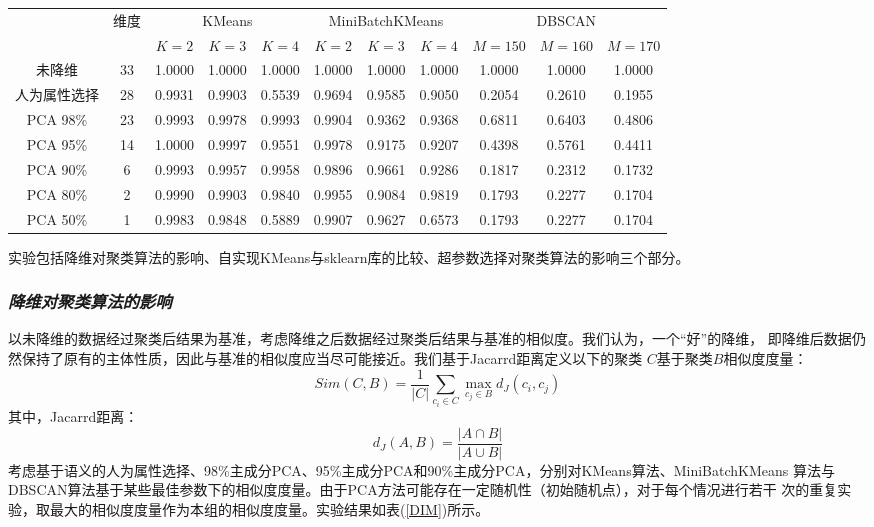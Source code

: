 \documentclass{acm_proc_article-sp}
\begin{document}
\begin{table*}[!ht]
       \small
       \centering
       \caption{降维对聚类算法影响评估}
       \begin{tabular}{@{}c|c|ccc|ccc|ccc@{}}
       \toprule
                     &\multicolumn{1}{c|}{\multirow{2}{*}{维度}} & \multicolumn{3}{c|}{KMeans} & \multicolumn{3}{c|}{MiniBatchKMeans} & \multicolumn{3}{c}{DBSCAN} \\
                     &\multicolumn{1}{c|}{}                     & $K=2$   & $K=3$   & $K=4$   & $K=2$      & $K=3$      & $K=4$      & $M=150$ & $M=160$ & $M=170$ \\ \midrule
       未降维         & 33                                       & 1.0000  & 1.0000  & 1.0000  & 1.0000     & 1.0000     & 1.0000     & 1.0000  & 1.0000  & 1.0000  \\
       人为属性选择    & 28                                       & 0.9931  & 0.9903  & 0.5539  & 0.9694     & 0.9585     & 0.9050     & 0.2054  & 0.2610  & 0.1955  \\
       PCA 98\%      & 23                                       & 0.9993  & 0.9978  & 0.9993  & 0.9904     & 0.9362     & 0.9368     & 0.6811  & 0.6403  & 0.4806  \\
       PCA 95\%      & 14                                       & 1.0000  & 0.9997  & 0.9551  & 0.9978     & 0.9175     & 0.9207     & 0.4398  & 0.5761  & 0.4411  \\
       PCA 90\%      & 6                                        & 0.9993  & 0.9957  & 0.9958  & 0.9896     & 0.9661     & 0.9286     & 0.1817  & 0.2312  & 0.1732  \\ 
       PCA 80\%      & 2                                        & 0.9990  & 0.9903  & 0.9840  & 0.9955     & 0.9084     & 0.9819     & 0.1793  & 0.2277  & 0.1704  \\ 
       PCA 50\%      & 1                                        & 0.9983  & 0.9848  & 0.5889  & 0.9907     & 0.9627     & 0.6573     & 0.1793  & 0.2277  & 0.1704  \\ \bottomrule
       \end{tabular}
       \label{DIM}
\end{table*}
       
实验包括降维对聚类算法的影响、自实现KMeans与sklearn库的比较、超参数选择对聚类算法的影响三个部分。

\subsubsection{\textit{降维对聚类算法的影响}}
以未降维的数据经过聚类后结果为基准，考虑降维之后数据经过聚类后结果与基准的相似度。我们认为，一个“好”的降维，
即降维后数据仍然保持了原有的主体性质，因此与基准的相似度应当尽可能接近。我们基于Jacarrd距离定义以下的聚类
$C$基于聚类$B$相似度度量：
$$Sim(C,B) = \frac{1}{|C|}\sum_{c_i\in C}\max_{c_j\in B}d_{J}(c_i,c_j)$$
其中，Jacarrd距离：
$$d_{J}(A,B) = \frac{|A\cap B|}{|A\cup B|}$$
考虑基于语义的人为属性选择、98\%主成分PCA、95\%主成分PCA和90\%主成分PCA，分别对KMeans算法、MiniBatchKMeans
算法与DBSCAN算法基于某些最佳参数下的相似度度量。由于PCA方法可能存在一定随机性（初始随机点），对于每个情况进行若干
次的重复实验，取最大的相似度度量作为本组的相似度度量。实验结果如表(\ref{DIM})所示。
\end{document}
